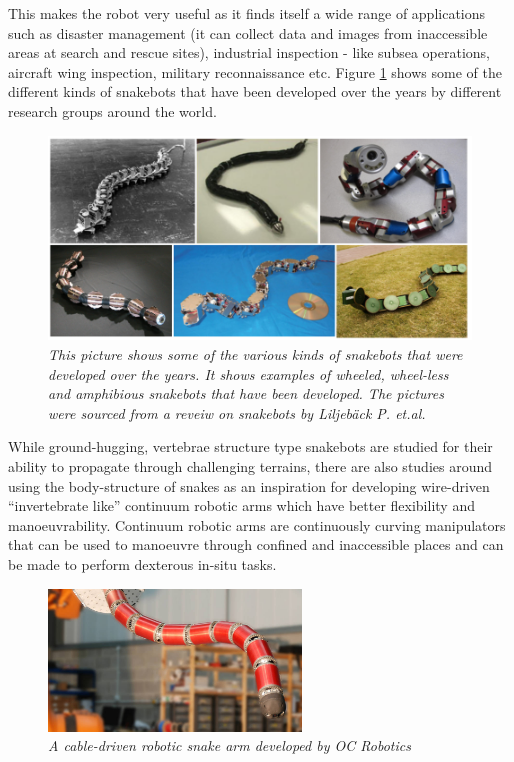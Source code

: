 \documentclass[a4paper,12pt]{report}
\begin{document}
This makes the robot very useful as it finds itself a wide range of applications such as disaster management (it can collect data and images from inaccessible areas at search and rescue sites), industrial inspection - like subsea operations, aircraft wing inspection, military reconnaissance etc. Figure \ref{snakebots-fig} shows some of the different kinds of snakebots that have been developed over the years by different research groups around the world.
\begin{figure}[h]
	\centering
	\includegraphics[width=\textwidth]{images/Intro-pic1.png}
	\caption{\textit{This picture shows some of the various kinds of snakebots that were developed over the years. It shows examples of wheeled, wheel-less and amphibious snakebots that have been developed. The pictures were sourced from a reveiw on snakebots by Liljeb{\"a}ck P. et.al. \cite{liljeback2012review}}}
	\label{snakebots-fig}
\end{figure}

While ground-hugging, vertebrae structure type snakebots are studied for their ability to propagate through challenging terrains, there are also studies around using the body-structure of snakes as an inspiration for developing wire-driven “invertebrate like” continuum robotic arms which have better flexibility and manoeuvrability. Continuum robotic arms are continuously curving manipulators that can be used to manoeuvre through confined and inaccessible places and can be made to perform dexterous in-situ tasks.


\begin{figure}
	\centering
	\includegraphics[width=0.6\textwidth]{images/CDHM.jpg}
	\caption{\textit{A cable-driven robotic snake arm developed by OC Robotics \cite{ CNNarticle}}}
\end{figure}
\end{document}

